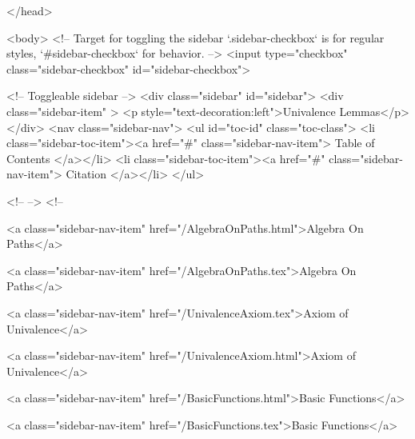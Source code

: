   
</head>




  <body>
    <!-- Target for toggling the sidebar `.sidebar-checkbox` is for regular
     styles, `#sidebar-checkbox` for behavior. -->
<input type="checkbox" class="sidebar-checkbox" id="sidebar-checkbox">

<!-- Toggleable sidebar -->
<div class="sidebar" id="sidebar">
  <div class="sidebar-item" >
    <p style="text-decoration:left">Univalence Lemmas</p>
  </div>
  <nav class="sidebar-nav">
    <ul id="toc-id" class="toc-class">
  <li class="sidebar-toc-item"><a href="#" class="sidebar-nav-item"> Table of Contents </a></li>
  <li class="sidebar-toc-item"><a href="#" class="sidebar-nav-item"> Citation </a></li>
</ul>


    <!--  -->
    <!-- 
      
    
      
    
      
    
      
        
      
    
      
        
          <a class="sidebar-nav-item" href="/AlgebraOnPaths.html">Algebra On Paths</a>
        
      
    
      
        
          <a class="sidebar-nav-item" href="/AlgebraOnPaths.tex">Algebra On Paths</a>
        
      
    
      
        
          <a class="sidebar-nav-item" href="/UnivalenceAxiom.tex">Axiom of Univalence</a>
        
      
    
      
        
          <a class="sidebar-nav-item" href="/UnivalenceAxiom.html">Axiom of Univalence</a>
        
      
    
      
        
          <a class="sidebar-nav-item" href="/BasicFunctions.html">Basic Functions</a>
        
      
    
      
        
          <a class="sidebar-nav-item" href="/BasicFunctions.tex">Basic Functions</a>
        
      
    
      
        
